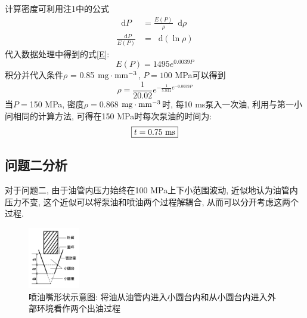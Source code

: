 \documentclass{cumcmthesis}
\renewcommand\d{\mathop{}\!\mathrm{d}}
\newcommand{\f}[2]{\frac{#1}{#2}}
\newcommand{\ar}[1]{
        \begin{aligned}                              %
            #1
        \end{aligned}   }
\newcommand{\x}{&=}
\begin{document}
计算密度可利用注1中的公式
$$\ar{
    \d P \x \frac{E(P)}{\rho}\d \rho\\
    \f{\d P}{E(P)} \x \d(\ln\rho)
}$$
代入数据处理中得到的式\ref{E}:
$$E(P) = 1495e^{0.0039P}$$
积分并代入条件$\rho$ = 0.85 $\textup{mg}\cdot\rm{mm}^{-3}$, $ P = 100$ MPa可以得到
\begin{equation}
\rho = \f{1}{20.02}e^{-\f{1}{5.831}e^{-0.0039P}}  \label{rho}
\end{equation}
当$P =$150 MPa, 密度$\rho =$0.868 $\textup{mg}\cdot\rm{mm}^{-3}$时, 
每10 ms泵入一次油, 利用与第一小问相同的计算方法, 可得在150 MPa时每次泵油的时间为: 
$$\boxed{t = 0.75\ \rm{ms}}$$


\subsection{问题二分析}
对于问题二, 由于油管内压力始终在100 MPa上下小范围波动, 近似地认为油管内压力不变, 这个近似可以将泵油和喷油两个过程解耦合, 从而可以分开考虑这两个过程. 

\begin{figure}[htbp]
    \centering
    \includegraphics[width=0.2\textwidth]{penzui.jpg} 
    \caption{喷油嘴形状示意图: 将油从油管内进入小圆台内和从小圆台内进入外部环境看作两个出油过程}
    \label{penzui}
\end{figure}
\end{document}
